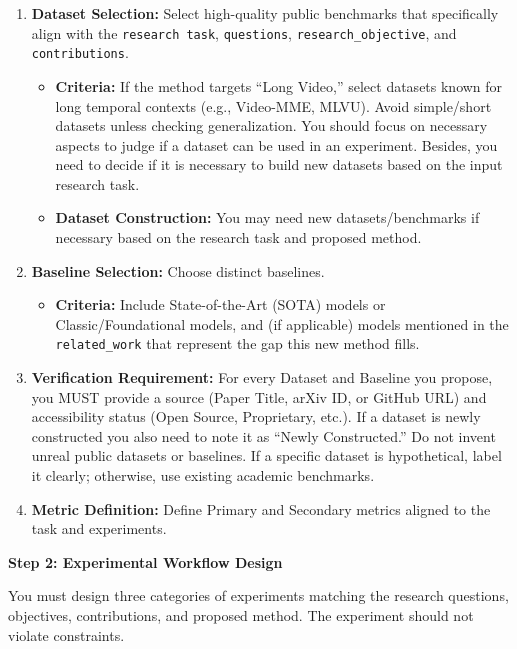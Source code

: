 \begin{tcolorbox}
\begin{enumerate}[nosep,leftmargin=12pt]
	\item \textbf{Dataset Selection:} Select high-quality public benchmarks that specifically align with the \texttt{research task}, \texttt{questions}, \texttt{research\_objective}, and \texttt{contributions}.
	\begin{itemize}[nosep,leftmargin=16pt]
		\item \textbf{Criteria:} If the method targets ``Long Video,'' select datasets known for long temporal contexts (e.g., Video-MME, MLVU). Avoid simple/short datasets unless checking generalization. You should focus on necessary aspects to judge if a dataset can be used in an experiment. Besides, you need to decide if it is necessary to build new datasets based on the input research task.
		\item \textbf{Dataset Construction:} You may need new datasets/benchmarks if necessary based on the research task and proposed method.
	\end{itemize}
	\item \textbf{Baseline Selection:} Choose distinct baselines.
	\begin{itemize}[nosep,leftmargin=16pt]
		\item \textbf{Criteria:} Include State-of-the-Art (SOTA) models or Classic/Foundational models, and (if applicable) models mentioned in the \texttt{related\_work} that represent the gap this new method fills.
	\end{itemize}
	\item \textbf{Verification Requirement:} For every Dataset and Baseline you propose, you MUST provide a source (Paper Title, arXiv ID, or GitHub URL) and accessibility status (Open Source, Proprietary, etc.). If a dataset is newly constructed you also need to note it as ``Newly Constructed.'' Do not invent unreal public datasets or baselines. If a specific dataset is hypothetical, label it clearly; otherwise, use existing academic benchmarks.
	\item \textbf{Metric Definition:} Define Primary and Secondary metrics aligned to the task and experiments.
\end{enumerate}

\medskip
\textbf{Step 2: Experimental Workflow Design}

You must design three categories of experiments matching the research questions, objectives, contributions, and proposed method. The experiment should not violate constraints.


\end{tcolorbox}
